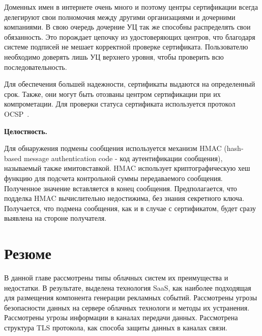 Доменных имен в интернете очень много и поэтому центры сертификации всегда делегируют свои полномочия между другими организациями и дочерними компаниями. В свою очередь дочерние УЦ так же способны распределять свои обязанность. Это порождает цепочку из удостоверяющих центров, что благодаря системе подписей не мешает корректной проверке сертификата. Пользователю необходимо доверять лишь УЦ верхнего уровня, чтобы проверить всю последовательность.

Для обеспечения большей надежности, сертификаты выдаются на определенный срок. Также, они могут быть отозваны центром сертификации при их компрометации. Для проверки статуса сертификата используется протокол OCSP~\cite{OCSP}.

\textbf{Целостность.}

Для обнаружения подмены сообщения используется механизм HMAC (hash-based message authentication code - код аутентификации сообщения), называемый также имитовставкой. HMAC использует криптографическую хеш функцию для подсчета контрольной суммы передаваемого сообщения. Полученное значение вставляется в конец сообщения. Предполагается, что подделка HMAC вычислительно недостижима, без знания секретного ключа. Получается, что подмена сообщения, как и в случае с сертификатом, будет сразу выявлена на стороне получателя.


\section{Резюме}

В данной главе рассмотрены типы облачных систем их преимущества и недостатки. В результате, выделена технология SaaS, как наиболее подходящая для размещения компонента генерации рекламных событий. Рассмотрены угрозы безопасности данных на сервере облачных технологи и методы их устранения. Рассмотрены угрозы информации в каналах передачи данных. Рассмотрена структура TLS протокола, как способа защиты данных в каналах связи.

